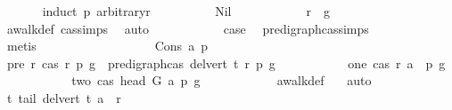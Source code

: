 \begin{isabellebody}
\ \ \ \ \ \ \isamarkupfalse%
{\isacharparenleft}{\kern0pt}induct\ p\ arbitrary{\isacharcolon}{\kern0pt}r{\isacharparenright}{\kern0pt}\isanewline
\ \ \ \ \ \ \ \ \isamarkupfalse%
\ Nil\isanewline
\ \ \ \ \ \ \ \ \isamarkupfalse%
\ \isamarkupfalse%
\ {\isachardoublequoteopen}r\ {\isacharequal}{\kern0pt}\ g{\isachardoublequoteclose}\ \isamarkupfalse%
\ awalk{\isacharunderscore}{\kern0pt}def\ cas{\isachardot}{\kern0pt}simps\ \isamarkupfalse%
\ auto\isanewline
\ \ \ \ \ \ \ \ \isamarkupfalse%
\ \isamarkupfalse%
\ {\isacharquery}{\kern0pt}case\ \isamarkupfalse%
\ pre{\isacharunderscore}{\kern0pt}digraph{\isachardot}{\kern0pt}cas{\isachardot}{\kern0pt}simps{\isacharparenleft}{\kern0pt}{}{\isacharparenright}{\kern0pt}\isanewline
\ \ \ \ \ \ \ \ \ \ \isamarkupfalse%
\ {\isacharparenleft}{\kern0pt}metis{\isacharparenright}{\kern0pt}\ \ \isanewline
\ \ \ \ \ \ \isamarkupfalse%
\isanewline
\ \ \ \ \ \ \ \ \isamarkupfalse%
\ {\isacharparenleft}{\kern0pt}Cons\ a\ p{\isacharparenright}{\kern0pt}\isanewline
\ \ \ \ \ \ \ \ \isamarkupfalse%
\ pre{\isacharcolon}{\kern0pt}\ {\isachardoublequoteopen}{\isasymAnd}r{\isachardot}{\kern0pt}\ {\isacharparenleft}{\kern0pt}cas\ r\ p\ g\ {\isasymLongrightarrow}\ pre{\isacharunderscore}{\kern0pt}digraph{\isachardot}{\kern0pt}cas\ {\isacharparenleft}{\kern0pt}del{\isacharunderscore}{\kern0pt}vert\ t{\isacharparenright}{\kern0pt}\ r\ p\ g{\isacharparenright}{\kern0pt}{\isachardoublequoteclose}\isanewline
\ \ \ \ \ \ \ \ \ \ \ one{\isacharcolon}{\kern0pt}\ {\isachardoublequoteopen}cas\ r\ {\isacharparenleft}{\kern0pt}a\ {\isacharhash}{\kern0pt}\ p{\isacharparenright}{\kern0pt}\ g{\isachardoublequoteclose}\isanewline
\ \ \ \ \ \ \ \ \isamarkupfalse%
\ \isamarkupfalse%
\ two{\isacharcolon}{\kern0pt}\ {\isachardoublequoteopen}cas\ {\isacharparenleft}{\kern0pt}head\ G\ a{\isacharparenright}{\kern0pt}\ p\ g{\isachardoublequoteclose}\isanewline
\ \ \ \ \ \ \ \ \ \ \isamarkupfalse%
\ awalk{\isacharunderscore}{\kern0pt}def\ \ \isamarkupfalse%
\ auto\isanewline
\ \ \ \ \ \ \ \ \isamarkupfalse%
\ \isamarkupfalse%
\ t{\isacharcolon}{\kern0pt}\ {\isachardoublequoteopen}tail\ {\isacharparenleft}{\kern0pt}del{\isacharunderscore}{\kern0pt}vert\ t{\isacharparenright}{\kern0pt}\ a\ {\isacharequal}{\kern0pt}\ r{\isachardoublequoteclose}\isanewline

\end{isabellebody}
